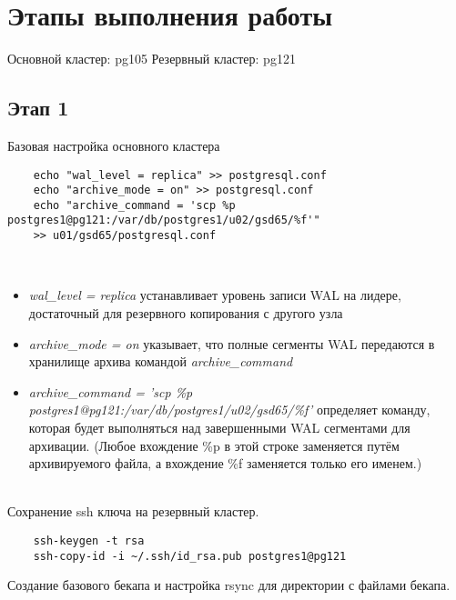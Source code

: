 \documentclass{article}
\begin{document}
\section{Этапы выполнения работы}

Основной кластер: pg105
Резервный кластер: pg121

\subsection{Этап 1}
Базовая настройка основного кластера
\begin{verbatim}
    echo "wal_level = replica" >> postgresql.conf
    echo "archive_mode = on" >> postgresql.conf
    echo "archive_command = 'scp %p postgres1@pg121:/var/db/postgres1/u02/gsd65/%f'" 
    >> u01/gsd65/postgresql.conf
\end{verbatim} \\
\begin{itemize}
    \item {\textit{wal\_level = replica} устанавливает уровень записи WAL на лидере, достаточный для резервного копирования с другого узла}
    \item {\textit{archive\_mode = on} указывает, что полные сегменты WAL передаются в хранилище архива командой \textit{archive\_command}}
    \item {\textit{archive\_command = 'scp \%p postgres1@pg121:/var/db/postgres1/u02/gsd65/\%f'} определяет команду, которая будет выполняться над завершенными WAL сегментами для архивации.
    (Любое вхождение \%p в этой строке заменяется путём архивируемого файла, а вхождение \%f заменяется только его именем.)
    }
\end{itemize}
\\
Сохранение ssh ключа на резервный кластер.
\begin{verbatim}
    ssh-keygen -t rsa
    ssh-copy-id -i ~/.ssh/id_rsa.pub postgres1@pg121
\end{verbatim}
Создание базового бекапа и настройка rsync для директории с файлами бекапа.
\end{document}
